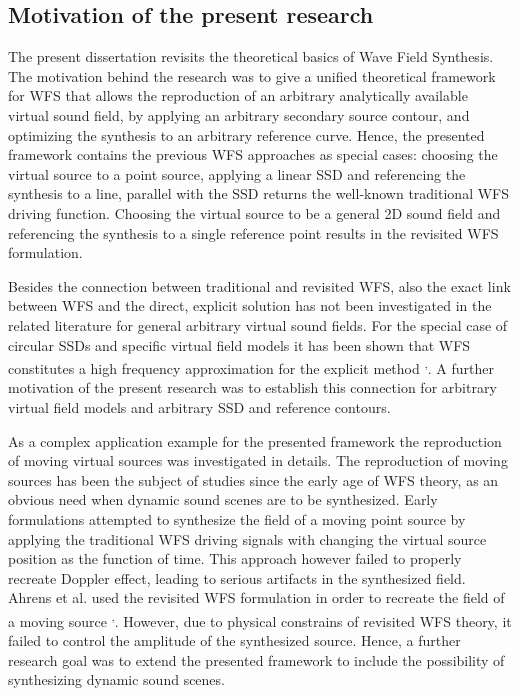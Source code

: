 \documentclass[10pt,twoside]{article}
\theoremstyle{thesisgroupstyle}
\theoremstyle{indented}
\begin{document}
\subsection{Motivation of the present research}
The present dissertation revisits the theoretical basics of Wave Field Synthesis.
The motivation behind the research was to give a unified theoretical framework for WFS that allows the reproduction of an arbitrary analytically available virtual sound field, by applying an arbitrary secondary source contour, and optimizing the synthesis to an arbitrary reference curve.
Hence, the presented framework contains the previous WFS approaches as special cases: choosing the virtual source to a point source, applying a linear SSD and referencing the synthesis to a line, parallel with the SSD returns the well-known traditional WFS driving function.
Choosing the virtual source to be a general 2D sound field and referencing the synthesis to a single reference point results in the revisited WFS formulation.

Besides the connection between traditional and revisited WFS, also the exact link between WFS and the direct, explicit solution has not been investigated in the related literature for general arbitrary virtual sound fields.
For the special case of circular SSDs and specific virtual field models it has been shown that WFS constitutes a high frequency approximation for the explicit method \textsuperscript{,}.
A further motivation of the present research was to establish this connection for arbitrary virtual field models and arbitrary SSD and reference contours.

As a complex application example for the presented framework the reproduction of moving virtual sources was investigated in details.
The reproduction of moving sources has been the subject of studies since the early age of WFS theory, as an obvious need when dynamic sound scenes are to be synthesized.
Early formulations attempted to synthesize the field of a moving point source by applying the traditional WFS driving signals with changing the virtual source position as the function of time.
This approach however failed to properly recreate Doppler effect, leading to serious artifacts in the synthesized field.
Ahrens et al. used the revisited WFS formulation in order to recreate the field of a moving source \textsuperscript{,}.
However, due to physical constrains of revisited WFS theory, it failed to control the amplitude of the synthesized source.
Hence, a further research goal was to extend the presented framework to include the possibility of synthesizing dynamic sound scenes.
\end{document}
